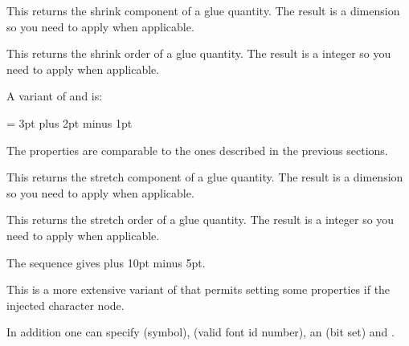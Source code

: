 This returns the shrink component of a glue quantity. The result is a dimension
so you need to apply  when applicable.

\stopoldprimitive

\startoldprimitive[title={\prm {glueshrinkorder}}]

This returns the shrink order of a glue quantity. The result is a integer so you
need to apply  when applicable.

\stopoldprimitive

\startnewprimitive[title={\prm {gluespecdef}}]

A variant of  and  is:

\starttyping
\gluespecdef\MyGlue = 3pt plus 2pt minus 1pt
\stoptyping

The properties are comparable to the ones described in the previous sections.

\stopnewprimitive

\startoldprimitive[title={\prm {gluestretch}}]

This returns the stretch component of a glue quantity. The result is a dimension
so you need to apply  when applicable.

\stopoldprimitive

\startoldprimitive[title={\prm {gluestretchorder}}]

This returns the stretch order of a glue quantity. The result is a integer so you
need to apply  when applicable.

\stopoldprimitive

\startoldprimitive[title={\prm {gluetomu}}]

The sequence  gives \the \gluetomu
20pt plus 10pt minus 5pt.

\stopoldprimitive

\startnewprimitive[title={\prm {glyph}}]

This is a more extensive variant of  that permits setting some
properties if the injected character node.

\startbuffer
{}
\quad
{}
\stopbuffer

\typebuffer

In addition one can specify  (symbol),  (valid font id
number), an  (bit set) and .

